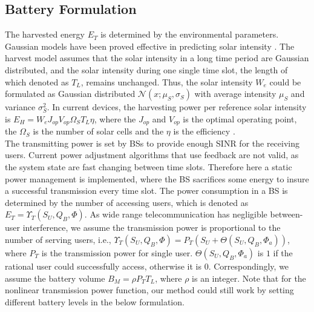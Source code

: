 \documentclass[conference]{IEEEtran}
\begin{document}
\subsection{Battery Formulation}
The harvested energy \(E_T\) is determined by the environmental parameters.
Gaussian models have been proved effective in predicting solar intensity \cite{gaussian,data}.
The harvest model assumes that the solar intensity in a long time period are Gaussian distributed, and the solar intensity during one single time slot, the length of which denoted as \(T_L\), remains unchanged.
Thus, the solar intensity \(W_e\) could be formulated as
Gaussian distributed \(\mathcal{N}\left(x;\mu_S,\sigma_S\right)\)
with average intensity \(\mu_S\) and variance \(\sigma_S^2\).
In current devices,
the harvesting power per reference solar intensity is
\(E_H = W_eJ_{op}V_{op}\Omega_ST_L\eta\), where the \(J_{op}\) and \(V_{op}\) is the optimal operating point,
the \(\Omega_S\) is the number of solar cells and the \(\eta\) is the efficiency \cite{physic}.\\
\indent The transmitting power is set by BSs to provide enough SINR for the receiving users.
Current power adjustment algorithms that use feedback are not valid,
as the system state are fast changing between time slots.
Therefore here a static power management is implemented,
where the BS sacrifices some energy to insure a successful transmission every time slot.
The power consumption in a BS is determined by the number of accessing users,
which is denoted as \(E_T = \Upsilon_T(S_U, Q_B, \Phi)\).
As wide range telecommunication has negligible between-user interference,
we assume the transmission power is proportional to the number of serving users, i.e.,
\(\Upsilon_T(S_U, Q_B, \Phi) = P_T(S_U + \Theta(S_U,Q_B,\Phi_a))\), where \(P_T\) is the transmission power for single user.
\(\Theta(S_U,Q_B,\Phi_a)\) is \(1\) if the rational user could successfully access, otherwise it is \(0\).
Correspondingly, we assume the battery volume \(B_M = \rho P_TT_L\), where \(\rho\) is an integer.
Note that for the nonlinear transmission power function,
our method could still work by setting different battery levels in the below formulation.
\end{document}

